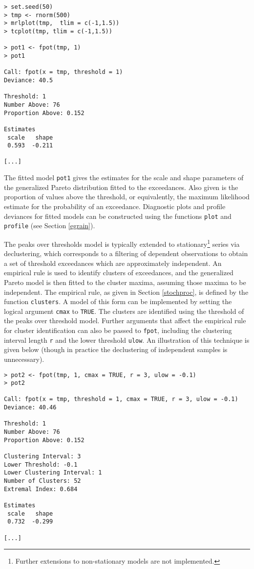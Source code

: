 \documentclass[11pt,a4paper]{article}
\begin{document}
\begin{verbatim}
> set.seed(50)
> tmp <- rnorm(500)
> mrlplot(tmp,  tlim = c(-1,1.5))
> tcplot(tmp, tlim = c(-1,1.5))

> pot1 <- fpot(tmp, 1)
> pot1

Call: fpot(x = tmp, threshold = 1) 
Deviance: 40.5 

Threshold: 1 
Number Above: 76 
Proportion Above: 0.152 

Estimates
 scale   shape  
 0.593  -0.211  

[...]
\end{verbatim}

The fitted model \verb+pot1+ gives the estimates for the scale and shape parameters of the generalized Pareto distribution fitted to the exceedances.
Also given is the proportion of values above the threshold, or equivalently, the maximum likelihood estimate for the probability of an exceedance.
Diagnostic plots and profile deviances for fitted models can be constructed using the functions \verb+plot+ and \verb+profile+ (see Section \ref{egrain}).

The peaks over thresholds model is typically extended to stationary\footnote{Further extensions to non-stationary models are not implemented.} series via declustering, which corresponds to a filtering of dependent observations to obtain a set of threshold exceedances which are approximately independent.
An empirical rule is used to identify clusters of exceedances, and the generalized Pareto model is then fitted to the cluster maxima, assuming those maxima to be independent.
The empirical rule, as given in Section \ref{stochproc}, is defined by the function \verb+clusters+.
A model of this form can be implemented by setting the logical argument \verb+cmax+ to \verb+TRUE+.
The clusters are identified using the threshold of the peaks over threshold model.
Further arguments that affect the empirical rule for cluster identification can also be passed to \verb+fpot+, including the clustering interval length \verb+r+ and the lower threshold \verb+ulow+.
An illustration of this technique is given below (though in practice the declustering of independent samples is unnecessary).
 
\begin{verbatim} 
> pot2 <- fpot(tmp, 1, cmax = TRUE, r = 3, ulow = -0.1)
> pot2

Call: fpot(x = tmp, threshold = 1, cmax = TRUE, r = 3, ulow = -0.1) 
Deviance: 40.46 

Threshold: 1 
Number Above: 76          
Proportion Above: 0.152 

Clustering Interval: 3 
Lower Threshold: -0.1 
Lower Clustering Interval: 1 
Number of Clusters: 52 
Extremal Index: 0.684 

Estimates
 scale   shape  
 0.732  -0.299

[...]  
\end{verbatim}
\end{document}
